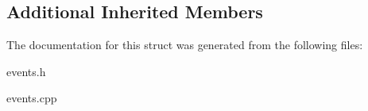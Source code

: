 \subsection*{Additional Inherited Members}


The documentation for this struct was generated from the following files\+:\begin{DoxyCompactItemize}
\item 
events.\+h\item 
events.\+cpp\end{DoxyCompactItemize}
